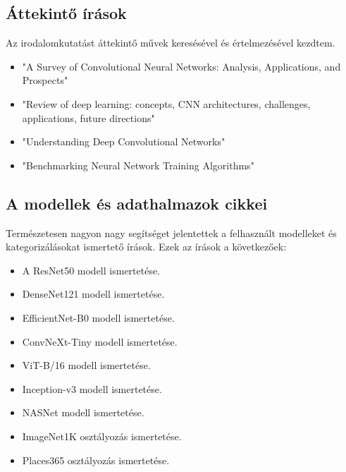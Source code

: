         \subsection{Áttekintő írások}
            Az irodalomkutatást áttekintő művek keresésével és értelmezésével kezdtem.
            \begin{itemize}
                \item "A Survey of Convolutional Neural Networks: Analysis, Applications, and Prospects"\cite{article_cnn_survey}
                \item "Review of deep learning: concepts, CNN architectures, challenges, applications, future directions"\cite{ardicle_dl_survey}
                \item "Understanding Deep Convolutional Networks"\cite{article_cnn_math}
                \item "Benchmarking Neural Network Training Algorithms"\cite{article_benchmarking}
            \end{itemize}

        \subsection{A modellek és adathalmazok cikkei}
            Természetesen nagyon nagy segítséget jelentettek a felhasznált modelleket és kategorizálásokat ismertető írások.
            Ezek az írások a következőek:
            \begin{itemize} 
                \item A ResNet50 modell ismertetése.\cite{article_resnet50}
                \item DenseNet121 modell ismertetése.\cite{article_densenet}
                \item EfficientNet-B0 modell ismertetése.\cite{article_efficientnet}
                \item ConvNeXt-Tiny modell ismertetése.\cite{article_convnext}
                \item ViT-B/16 modell ismertetése.\cite{article_vit_b16}
                \item Inception-v3 modell ismertetése.\cite{article_inception_v3}
                \item NASNet modell ismertetése.\cite{article_nasnet}
                \item ImageNet1K osztályozás ismertetése.\cite{article_ImageNet1K}
                \item Places365 osztályozás ismertetése.\cite{article_places365}
            \end{itemize}
        
